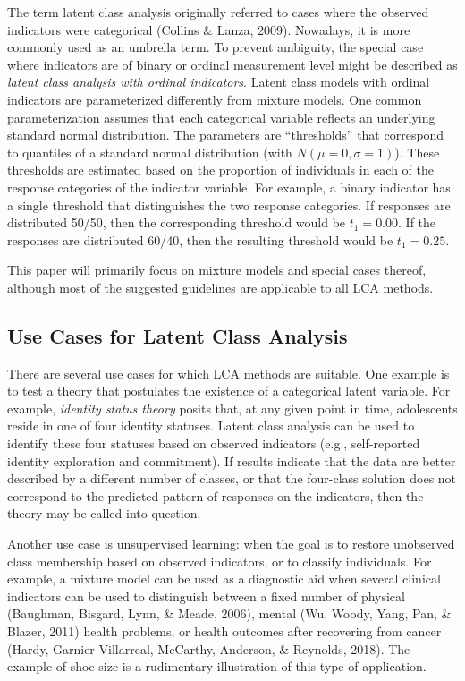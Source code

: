 \documentclass[
  ,man,floatsintext]{apa6}
\begin{document}
The term latent class analysis originally referred to cases where the
observed indicators were categorical (Collins \& Lanza, 2009).
Nowadays, it is more commonly used
as an umbrella term. To prevent ambiguity, the special case where
indicators are of binary or ordinal measurement level might be described
as \emph{latent class analysis with ordinal indicators}. Latent class models
with ordinal indicators are parameterized differently from mixture
models. One common parameterization assumes that each categorical
variable reflects an underlying standard normal distribution. The
parameters are ``thresholds'' that correspond to quantiles of a standard
normal distribution (with \(N(\mu = 0, \sigma = 1)\)). These thresholds
are estimated based on the proportion of individuals in each of the
response categories of the indicator variable. For example, a binary
indicator has a single threshold that distinguishes the two response
categories. If responses are distributed 50/50, then the corresponding
threshold would be \(t_1 = 0.00\). If the responses are distributed 60/40,
then the resulting threshold would be \(t_1 = 0.25\).

This paper will primarily focus on mixture models and special cases
thereof, although most of the suggested guidelines are applicable to all
LCA methods.

\hypertarget{use-cases-for-latent-class-analysis}{%
\subsection{Use Cases for Latent Class Analysis}\label{use-cases-for-latent-class-analysis}}

There are several use cases for which LCA methods are suitable. One
example is to test a theory that postulates the existence of a
categorical latent variable. For example, \emph{identity status theory}
posits that, at any given point in time, adolescents reside in one of
four identity statuses. Latent class analysis can be used to identify
these four statuses based on observed indicators (e.g., self-reported
identity exploration and commitment). If results indicate that the data
are better described by a different number of classes, or that the
four-class solution does not correspond to the predicted pattern of
responses on the indicators, then the theory may be called into
question.

Another use case is unsupervised learning: when the goal is to restore
unobserved class membership based on observed indicators, or to classify
individuals. For example, a mixture model can be used as a diagnostic
aid when several clinical indicators can be used to distinguish between
a fixed number of physical (Baughman, Bisgard, Lynn, \& Meade, 2006), mental
(Wu, Woody, Yang, Pan, \& Blazer, 2011) health problems, or health outcomes after recovering from cancer (Hardy, Garnier-Villarreal, McCarthy, Anderson, \& Reynolds, 2018). The example of shoe size is a
rudimentary illustration of this type of application.
\end{document}
